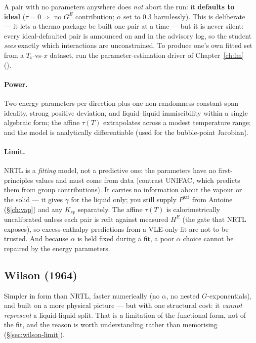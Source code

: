 \documentclass[11pt,a4paper]{article}
\newcommand{\Psat}{P^{\mathrm{sat}}}
\newcommand{\Gex}{G^{E}}
\begin{document}
A pair with no parameters anywhere does \emph{not} abort the run: it
\textbf{defaults to ideal} ($\tau=0\Rightarrow$ no $\Gex$ contribution;
$\alpha$ set to $0.3$ harmlessly). This is deliberate --- it lets a
thermo package be built one pair at a time --- but it is never silent:
every ideal-defaulted pair is announced on  and in the
advisory log, so the student \emph{sees} exactly which interactions are
unconstrained. To produce one's own fitted set from a $T_b$-vs-$x$
dataset, run the parameter-estimation driver of Chapter~\ref{ch:lm}
().

\paragraph{Power.} Two energy parameters per direction plus one
non-randomness constant span ideality, strong positive deviation, and
liquid--liquid immiscibility within a single algebraic form; the affine
$\tau(T)$ extrapolates across a modest temperature range; and the model
is analytically differentiable (used for the bubble-point Jacobian).

\paragraph{Limit.} NRTL is a \emph{fitting} model, not a predictive
one: the parameters have no first-principles values and must come from
data (contrast UNIFAC, which predicts them from group contributions).
It carries no information about the vapour or the solid --- it gives
$\gamma$ for the liquid only; you still supply $\Psat$ from Antoine
(\S\ref{ch:vap}) and any $K_{sp}$ separately. The affine $\tau(T)$ is
calorimetrically uncalibrated unless each pair is refit against
measured $H^E$ (the  gate that NRTL exposes), so
excess-enthalpy predictions from a VLE-only fit are not to be trusted.
And because $\alpha$ is held fixed during a fit, a poor $\alpha$ choice
cannot be repaired by the energy parameters.

\subsection{Wilson (1964)}\label{sec:wilson}

Simpler in form than NRTL, faster numerically (no $\alpha$, no nested
$G$-exponentials), and built on a more physical picture --- but with one
structural cost: it \emph{cannot represent} a liquid-liquid split. That
is a limitation of the functional form, not of the fit, and the reason
is worth understanding rather than memorising (\S\ref{sec:wilson-limit}).
\end{document}
